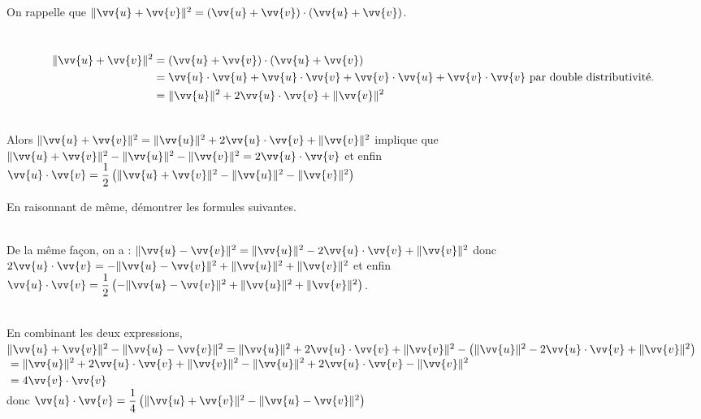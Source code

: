 \documentclass[12pt,a4paper]{book}
\begin{document}
On rappelle que $\|\vv{u}+\vv{v}\|^{2}=(\vv{u}+\vv{v}) \cdot(\vv{u}+\vv{v})$.
\begin{enumMet}
    \item 
    \begin{enumMet}
        \item {}\\
$$
\begin{aligned}
\|\vv{u}+\vv{v}\|^{2} &=(\vv{u}+\vv{v}) \cdot(\vv{u}+\vv{v}) \\
&=\vv{u} \cdot \vv{u}+\vv{u} \cdot \vv{v}+\vv{v} \cdot \vv{u}+\vv{v} \cdot \vv{v} \text { par double distributivité. } \\
&=\|\vv{u}\|^{2}+2 \vv{u} \cdot \vv{v}+\|\vv{v}\|^{2}
\end{aligned}
$$
    \item {}\\
Alors $\|\vv{u}+\vv{v}\|^{2}=\|\vv{u}\|^{2}+2 \vv{u} \cdot \vv{v}+\|\vv{v}\|^{2}$ implique que $\|\vv{u}+\vv{v}\|^{2}-\|\vv{u}\|^{2}-\|\vv{v}\|^{2}=2 \vv{u} \cdot \vv{v}$ et enfin\\
$\vv{u} \cdot \vv{v}=\dfrac{1}{2}\left(\|\vv{u}+\vv{v}\|^{2}-\|\vv{u}\|^{2}-\|\vv{v}\|^{2}\right)$
    \end{enumMet}
    \item En raisonnant de même, démontrer les formules suivantes.\\
    \begin{enumMet}
        \item {}\\
De la même façon, on a : $\|\vv{u}-\vv{v}\|^{2}=\|\vv{u}\|^{2}-2 \vv{u} \cdot \vv{v}+\|\vv{v}\|^{2}$ donc $2 \vv{u} \cdot \vv{v}=-\|\vv{u}-\vv{v}\|^{2}+\|\vv{u}\|^{2}+\|\vv{v}\|^{2}$ et enfin $\vv{u} \cdot \vv{v}=\dfrac{1}{2}\left(-\|\vv{u}-\vv{v}\|^{2}+\|\vv{u}\|^{2}+\|\vv{v}\|^{2}\right)$.
        \item {}\\

En combinant les deux expressions,\\
$\|\vv{u}+\vv{v}\|^{2}-\|\vv{u}-\vv{v}\|^{2}=\|\vv{u}\|^{2}+2 \vv{u} \cdot \vv{v}+\|\vv{v}\|^{2}-\left(\|\vv{u}\|^{2}-2 \vv{u} \cdot \vv{v}+\|\vv{v}\|^{2}\right)$\\
$\begin{aligned} &=\|\vv{u}\|^{2}+2 \vv{u} \cdot \vv{v}+\|\vv{v}\|^{2}-\|\vv{u}\|^{2}+2 \vv{u} \cdot \vv{v}-\|\vv{v}\|^{2} \\ &=4 \vv{v} \cdot \vv{v} \end{aligned}$\\
donc $\vv{u} \cdot \vv{v}=\dfrac{1}{4}\left(\|\vv{u}+\vv{v}\|^{2}-\|\vv{u}-\vv{v}\|^{2}\right)$
    \end{enumMet}
\end{enumMet}
\end{document}
